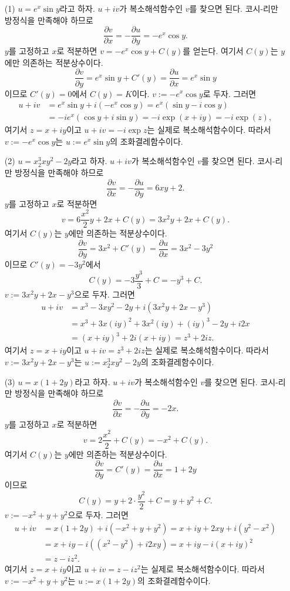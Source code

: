 \begin{itemize}
\item[(1)] $u=e^x\sin y$라고 하자. $u+iv$가 복소해석함수인 $v$를 찾으면 된다.
코시-리만 방정식을 만족해야 하므로
\[
\dfrac{\partial v}{\partial x} = - \dfrac{\partial u}{\partial y}= -e^x\cos y.
\]
$y$를 고정하고 $x$로 적분하면 $v=-e^x \cos y + C(y)$를 얻는다. 
여기서 $C(y)$는 $y$에만 의존하는 적분상수이다.
\[
\dfrac{\partial v}{\partial  y} = e^x\sin y + C'(y) 
= \dfrac{\partial u}{\partial x} = e^x \sin y
\]
이므로 $C'(y)=0$에서 $C(y)=K$이다.
$v:= -e^x \cos y$로 두자. 그러면
\begin{align*}
u+iv &= e^x\sin y + i(-e^x\cos y) = e^x (\sin y - i\cos y) \\
&= -ie^x(\cos y +i\sin y) = -i \exp(x+iy) = -i\exp(z),
\end{align*}
여기서 $z=x+iy$이고
$u+iv = -i\exp z$는 실제로 복소해석함수이다.
따라서 $v:=-e^x\cos y$는 $u:=e^x\sin y$의 조화결레함수이다.

\item[(2)] $u= x^3_2xy^2-2y$라고 하자. $u+iv$가 복소해석함수인 $v$를 찾으면 된다.
코시-리만 방정식을 만족해야 하므로
\[
\dfrac{\partial v}{\partial x} = - \dfrac{\partial u}{\partial y}= 6xy+2.
\]
$y$를 고정하고 $x$로 적분하면 
\[
v = 6\dfrac{x^2}{2}y + 2x + C(y) = 3x^2y +2x+ C(y).
\]
여기서 $C(y)$는 $y$에만 의존하는 적분상수이다.
\[
\dfrac{\partial v}{\partial  y} = 3x^2 + C'(y) 
= \dfrac{\partial u}{\partial x} = 3x^2 - 3y^2
\]
이므로 $C'(y)=-3y^2$에서 
\[
 C(y) = -3\dfrac{y^3}{3} + C  = -y^3+C.
\]
$v:= 3x^2y+2x-y^3$으로 두자. 그러면
\begin{align*}
u+iv &= x^3-3xy^2 -2y +i(3x^2y + 2x-y^3) \\  
&= x^3 +3x(iy)^2 + 3x^2(iy) +(iy)^3 -2y +i2x \\
&= (x+iy)^3 + 2i(x+iy) = z^3+2iz.
\end{align*}
여기서 $z=x+iy$이고
$u+iv =z^3+2iz$는 실제로 복소해석함수이다.
따라서 $v:=3x^2y+2x-y^3$는 $u:=x^3_2xy^2-2y$의 조화결레함수이다.

\item[(3)] $u= x(1+2y)$라고 하자. $u+iv$가 복소해석함수인 $v$를 찾으면 된다.
코시-리만 방정식을 만족해야 하므로
\[
\dfrac{\partial v}{\partial x} = - \dfrac{\partial u}{\partial y}= -2x.
\]
$y$를 고정하고 $x$로 적분하면 
\[
v = 2\dfrac{x^2}{2} + C(y) = -x^2 + C(y).
\]
여기서 $C(y)$는 $y$에만 의존하는 적분상수이다.
\[
\dfrac{\partial v}{\partial  y} =  C'(y) 
= \dfrac{\partial u}{\partial x} = 1+2y
\]
이므로
\[
 C(y) = y + 2\cdot \dfrac{y^2}2 + C = y + y^2 + C.
\]
$v:= -x^2+y+y^2$으로 두자. 그러면
\begin{align*}
u+iv &= x(1+2y) + i(-x^2+y+y^2) = x+iy + 2xy + i(y^2-x^2) \\
&= x + iy -i( (x^2-y^ 2) +i2xy ) = x+ iy -i(x+iy)^2 \\
&=  z- iz^2.
\end{align*}
여기서 $z=x+iy$이고
$u+iv =z-iz^2$는 실제로 복소해석함수이다.
따라서 $v:=-x^2 + y+y^2$는 $u:=x(1+2y)$의 조화결레함수이다.

\end{itemize}


